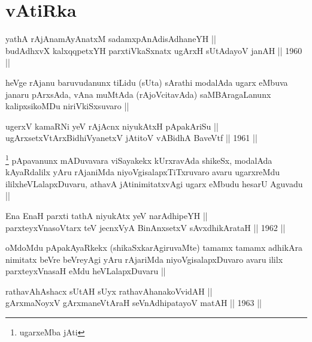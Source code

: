\section*{vAtiRka}

\begin{shl}
yathA rAjAnamAyAnatxM sadamxpAnAdisAdhaneYH || \\
budAdhxvX kalxqqpetxYH parxtiVkaSxnatx ugArxH sUtAdayoV janAH ||  1960 ||  
\end{shl}

\begin{artha}
heVge rAjanu baruvudanunx tiLidu (sUta) sArathi modalAda ugarx eMbuva
janaru pArxsAda, vAna muMtAda (rAjoVcitavAda) saMBAragaLanunx
kalipxsikoMDu niriVkiSxsuvaro ||
\end{artha}


\begin{shl}
ugerxV kamaRNi yeV rAjAcnx niyukAtxH pApakAriSu || \\
ugArxsetxV\s tArxBidhiVyanetxV jAtitoV vA\s BidhA BaveVtf ||  1961 ||  
\end{shl}

\begin{artha}
\footnote[1]{ugarxeMba jAti}
pApavanunx mADuvavara viSayakekx kUrxravAda shikeSx, modalAda
kAyaRdalilx yAru rAjaniMda niyoVgisalapxTiTxruvaro avaru ugarxreMdu
ililxheVLalapxDuvaru, athavA jAtinimitatxvAgi ugarx eMbudu hesarU
Aguvadu ||
\end{artha}


\begin{shl}
Ena EnaH parxti tathA niyukAtx yeV narAdhipeYH || \\
parxteyxVnasoV\s tarx teV jecnxVyA BinAnxsetxV sAvxdhikArataH ||  1962 ||  
\end{shl}

\begin{artha}
oMdoMdu pApakAyaRkekx (shikaSxkarAgiruvaMte) tamamx tamamx adhikAra
nimitatx beVre beVreyAgi yAru rAjariMda niyoVgisalapxDuvaro avaru
ililx parxteyxVnasaH eMdu heVLalapxDuvaru ||
\end{artha}


\begin{shl}
rathavAhAshacx sUtAH sUyx rathavAhanakoVvidAH || \\
gArxmaNoyxV gArxmaneVtAraH seVnAdhipatayoV matAH ||  1963 ||  
\end{shl}

